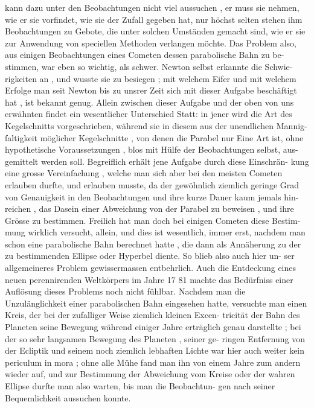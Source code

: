 \documentclass[12pt,a4paper]{article}
\begin{document}
\newpage

kann  dazu  unter  den  Beobachtungen  nicht  viel  aussuchen ,  er  muss  sie  nehmen,
wie  er  sie  vorfindet,  wie  sie  der  Zufall  gegeben  hat,  nur  höchst  selten  stehen  ihm
Beobachtungen  zu  Gebote,  die  unter  solchen  Umständen  gemacht  sind,  wie  er
sie  zur  Anwendung  von  speciellen  Methoden  verlangen  möchte.  Das  Problem
also,  aus  einigen  Beobachtungen  eines  Cometen  dessen  parabolische  Bahn  zu  be-
stimmen, war  eben  so  wichtig,  als  schwer.  Newton  selbst  erkannte  die  Schwie-
rigkeiten an ,  und  wusste  sie  zu  besiegen ;  mit  welchem  Eifer  und  mit  welchem
Erfolge  man  seit  Newton  bis  zu  unsrer  Zeit  sich  mit  dieser  Aufgabe  beschäftigt
hat ,  ist  bekannt  genug.  Allein  zwischen  dieser  Aufgabe  und  der  oben  von  uns
erwähnten  findet  ein  wesentlicher  Unterschied  Statt:  in  jener  wird  die  Art  des
Kegelschnitts  vorgeschrieben,  während  sie  in  diesem  aus  der  unendlichen  Mannig-
faltigkeit möglicher  Kegelschnitte ,  von  denen  die  Parabel  nur  Eine  Art  ist,  ohne
hypothetische  Voraussetzungen ,  blos  mit  Hülfe  der  Beobachtungen  selbst,  aus-
gemittelt  werden  soll.  Begreiflich  erhält  jene  Aufgabe  durch  diese  Einschrän-
kung eine  grosse  Vereinfachung ,  welche  man  sich  aber  bei  den  meisten  Cometen
erlauben  durfte,  und  erlauben  musste,  da  der  gewöhnlich  ziemlich  geringe  Grad
von  Genauigkeit  in  den  Beobachtungen  und  ihre  kurze  Dauer  kaum  jemals  hin-
reichen ,  das  Dasein  einer  Abweichung  von  der  Parabel  zu  beweisen ,  und  ihre
Grösse  zu  bestimmen.  Freilich  hat  man  doch  bei  einigen  Cometen  diese  Bestim-
mung wirklich  versucht,  allein,  und  dies  ist  wesentlich,  immer  erst,  nachdem
man  schon  eine  parabolische  Bahn  berechnet  hatte ,  die  dann  als  Annäherung  zu
der  zu  bestimmenden  Ellipse  oder  Hyperbel  diente.  So  blieb  also  auch  hier  un-
ser allgemeineres  Problem  gewissermassen  entbehrlich.
Auch  die  Entdeckung  eines  neuen  perennirenden  Weltkörpers  im  Jahre
17  81  machte  das  Bedürfniss  einer  Auflösung  dieses  Problems  noch  nicht  fühlbar.
Nachdem  man  die  Unzulänglichkeit  einer  parabolischen  Bahn  eingesehen  hatte,
versuchte  man  einen  Kreis,  der  bei  der  zufalliger  Weise  ziemlich  kleinen  Excen-
tricität  der  Bahn  des  Planeten  seine  Bewegung  während  einiger  Jahre  erträglich
genau  darstellte ;  bei  der  so  sehr  langsamen  Bewegung  des  Planeten ,  seiner  ge-
ringen Entfernung  von  der  Ecliptik  und  seinem  noch  ziemlich  lebhaften  Lichte
war  hier  auch  weiter  kein  periculum  in  mora ;  ohne  alle  Mühe  fand  man  ihn  von
einem  Jahre  zum  andern  wieder  auf,  und  zur  Bestimmung  der  Abweichung  vom
Kreise  oder  der  wahren  Ellipse  durfte  man  also  warten,  bis  man  die  Beobachtun-
gen nach  seiner  Bequemlichkeit  aussuchen  konnte.
\end{document}
